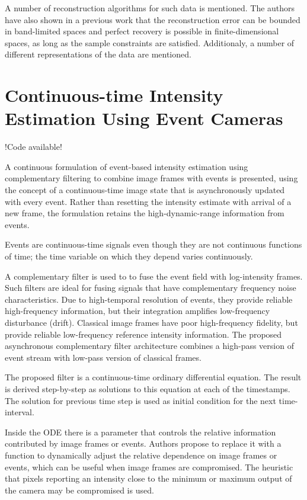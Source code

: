 \documentclass[10pt,a4paper]{article}
\begin{document}
A number of reconstruction algorithms for such data is mentioned.
The authors have also shown in a previous work that the reconstruction error can be bounded in band-limited spaces and perfect recovery is possible in finite-dimensional spaces, as long as the sample constraints are satisfied.
Additionaly, a number of different representations of the data are mentioned.

\section{Continuous-time Intensity Estimation Using Event Cameras}
!Code available!

A continuous formulation of event-based intensity estimation using complementary filtering to combine image frames with events is presented, using the concept of a continuous-time image state that is asynchronously updated with every event.
Rather than resetting the intensity estimate with arrival of a new frame, the formulation retains the high-dynamic-range information from events.

Events are continuous-time signals even though they are not continuous functions of time; the time variable on which they depend varies continuously.

A complementary filter is used to to fuse the event field with log-intensity frames. 
Such filters are ideal for fusing signals that have complementary frequency noise characteristics.
Due to high-temporal resolution of events, they provide reliable high-frequency information, but their integration amplifies low-frequency disturbance (drift).
Classical image frames have poor high-frequency fidelity, but provide reliable low-frequency reference intensity information.
The proposed asynchronous complementary filter architecture combines a high-pass version of event stream with low-pass version of classical frames.

The proposed filter is a continuous-time ordinary differential equation. The result is derived step-by-step as solutions to this equation at each of the timestamps. 
The solution for previous time step is used as initial condition for the next time-interval.

Inside the ODE there is a parameter that controls the relative information contributed by image frames or events. 
Authors propose to replace it with a function to dynamically adjust the relative dependence on image frames or events, which can be useful when image frames are compromised.
The heuristic that pixels reporting an intensity close to the minimum or maximum output of the camera may be compromised is used.
\end{document}
